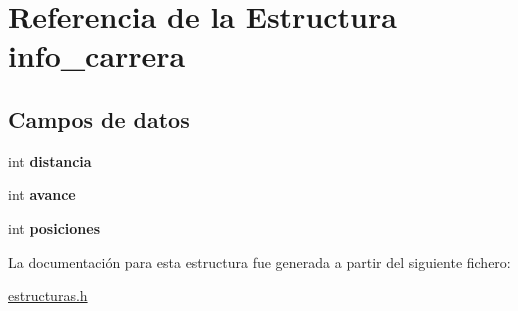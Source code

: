 \hypertarget{structinfo__carrera}{}\section{Referencia de la Estructura info\+\_\+carrera}
\label{structinfo__carrera}
\subsection*{Campos de datos}
\begin{DoxyCompactItemize}
\item 
\mbox{\label{structinfo__carrera_a4c697e5678aed208c95bbc9a8172260c}} 
int {\bfseries distancia}
\item 
\mbox{\label{structinfo__carrera_ae40c0eaa02fefdbe8dc6458b833878ff}} 
int {\bfseries avance}
\item 
\mbox{\label{structinfo__carrera_a8985793abbfb7ab7f94f19581f220df2}} 
int {\bfseries posiciones}
\end{DoxyCompactItemize}


La documentación para esta estructura fue generada a partir del siguiente fichero\+:\begin{DoxyCompactItemize}
\item 
\hyperlink{estructuras_8h}{estructuras.\+h}\end{DoxyCompactItemize}
